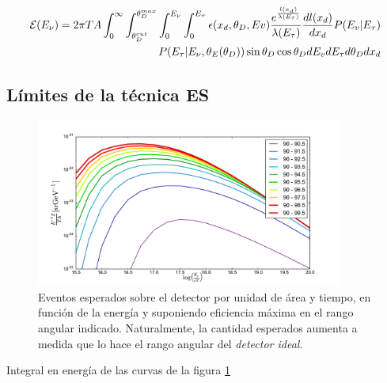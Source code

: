 	\begin{displaymath}
		\begin{aligned}
			{\cal E} (E_\nu) = 2 \pi T A
			\int_{0}^{\infty} 
			\int_{\theta_D^{cut}}^{\theta_D^{max}} 
			\int_{0}^{E_\nu} 
			\int_{0}^{E_\tau} 
			\epsilon (x_d,\theta_D,Ev) 
			\frac{e^{\frac{l(x_d)}{\lambda(E_\tau)}}}{\lambda(E_\tau)}\frac{dl(x_d)}{dx_d}
			P(E_v|E_\tau)\\
			P(E_\tau|E_\nu,\theta_E(\theta_D))
			\sin \theta_D \cos \theta_D
			dE_v dE_\tau  d\theta_D dx_d
		\end{aligned}
	\end{displaymath}
	
	
	
	\subsection{L\'imites de la t\'ecnica ES}
	\begin{figure}[h!]
		\begin{center}
			\includegraphics[width=0.9\textwidth]{fig/resultadosRadio/exposureFullEff_thetas}
			\caption{\label{fig:exposuresFluxThetas} Eventos esperados sobre el detector por unidad de \'area y tiempo, en funci\'on de la energ\'ia y suponiendo eficiencia m\'axima en el rango angular indicado.
			Naturalmente, la cantidad esperados aumenta a medida que lo hace el rango angular del \emph{detector ideal}.
			}
		\end{center}
	\end{figure}
	
	Integral en energ\'ia de las curvas de la figura \ref{fig:exposuresFluxThetas}
	
